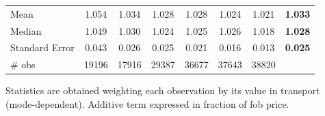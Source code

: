 \documentclass[a4paper,11pt]{article}
\begin{document}
\begin{table}[htbp]
\begin{center}
\begin{tabular}{lccccccc}
Mean  & 1.054 & 1.034 & \multicolumn{1}{c}{1.028} & \multicolumn{1}{c}{1.028} & \multicolumn{1}{c}{1.024} & \multicolumn{1}{c}{1.021} & \textbf{1.033} \\
Median & 1.049 & 1.030 & \multicolumn{1}{c}{1.024} & \multicolumn{1}{c}{1.025} & \multicolumn{1}{c}{1.026} & \multicolumn{1}{c}{1.018} & \textbf{1.028} \\
Standard Error & 0.043 & 0.026 & \multicolumn{1}{c}{0.025} & \multicolumn{1}{c}{0.021} & \multicolumn{1}{c}{0.016} & \multicolumn{1}{c}{0.013} & \textbf{0.025} \\
\# obs & 19196 & 17916 & \multicolumn{1}{c}{29387} & \multicolumn{1}{c}{36677} & \multicolumn{1}{c}{37643} & \multicolumn{1}{c}{38820} & \textbf{}\\
\hline\hline
    \end{tabular}%
  \end{center}
  \label{tab:result_ves_rob}%
\vspace{-10pt}\tiny{Statistics are obtained weighting each observation by its value in transport (mode-dependent). Additive term expressed in fraction of fob price. }
\end{table}%
\end{document}
